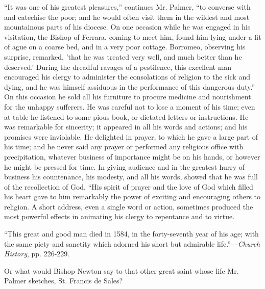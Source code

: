 ``It was one of his greatest pleasures,'' continues Mr.
Palmer, ``to converse with and catechise the poor; and he would
often visit them in the wildest and most mountainous parts of his
diocese. On one occasion while he was engaged in his visitation, the
Bishop of Ferrara, coming to meet him, found him lying under a fit of
ague on a coarse bed, and in a very poor cottage. Borromeo, observing
his surprise, remarked, 'that he was treated very well, and much
better than he deserved.' During the dreadful ravages of a pestilence,
this excellent man encouraged his clergy to administer the
consolations of religion to the sick and dying, and he was himself
assiduous in the performance of this dangerous duty.'' On this
occasion he sold all his furniture to procure medicine and nourishment
for the unhappy sufferers. He was careful not to lose a moment of his
time; even at table he listened to some pious book, or dictated
letters or instructions. He was remarkable for sincerity; it appeared
in all his words and actions; and his promises were inviolable. He
delighted in prayer, to which he gave a large part of his time; and he
never said any prayer or performed any religious office with precipitation, whatever business of importance might be on his hands,
or however he might be pressed for time. In giving audience and in the
greatest hurry of business his countenance, his modesty, and all his
words, showed that he was full of the recollection of God. ``His
spirit of prayer and the love of God which filled his heart gave to
him remarkably the power of exciting and encouraging others to
religion. A short address, even a single word or action, sometimes
produced the most powerful effects in animating his clergy to
repentance and to virtue.

``This great and good man died in 1584, in the forty-seventh
year of his age; with the same piety and sanctity which adorned his
short but admirable life.''—\emph{Church History}, pp. 226-229.

Or what would Bishop Newton say to that other great saint whose
life Mr. Palmer sketches, St. Francis de Sales?

